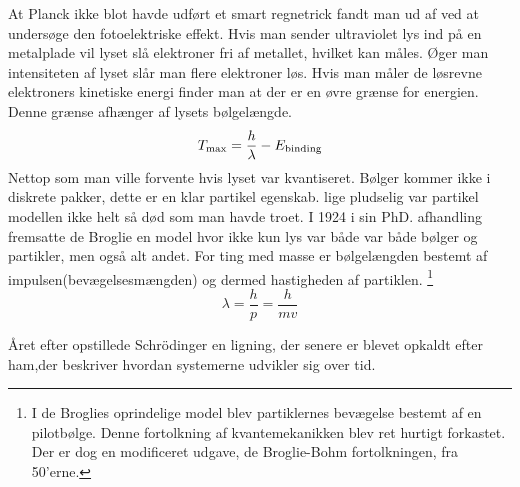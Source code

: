 \documentclass[../Kvantemekanik.tex]{subfiles}
\begin{document}
At Planck ikke blot havde udført et smart regnetrick fandt man ud af ved at undersøge den fotoelektriske effekt. Hvis man sender ultraviolet lys ind på en metalplade vil lyset slå elektroner fri af metallet, hvilket kan måles. Øger man intensiteten af lyset slår man flere elektroner løs. Hvis man måler de løsrevne elektroners kinetiske energi finder man at der er en øvre grænse for energien. Denne grænse afhænger af lysets bølgelængde.
$$
T_{\text{max}} = \frac{h}{\lambda}-E_{\text{binding}}
$$
Nettop som man ville forvente hvis lyset var kvantiseret. Bølger kommer ikke i diskrete pakker, dette er en klar partikel egenskab.
lige pludselig var partikel modellen ikke helt så død som man havde troet. I 1924 i sin PhD. afhandling fremsatte de Broglie en model hvor ikke kun lys var både var både bølger og partikler, men også alt andet. For ting med masse er bølgelængden bestemt af impulsen(bevægelsesmængden) og dermed hastigheden af partiklen.
\footnote{I de Broglies oprindelige model blev partiklernes bevægelse bestemt af en pilotbølge. Denne fortolkning af kvantemekanikken blev ret hurtigt forkastet. Der er dog en modificeret udgave, de Broglie-Bohm fortolkningen, fra 50'erne.}
\begin{equation}
\lambda = \frac{h}{p} = \frac{h}{mv}
\end{equation}

Året efter opstillede Schrödinger en ligning, der senere er blevet opkaldt efter ham,der beskriver hvordan systemerne udvikler sig over tid. 
\end{document}
